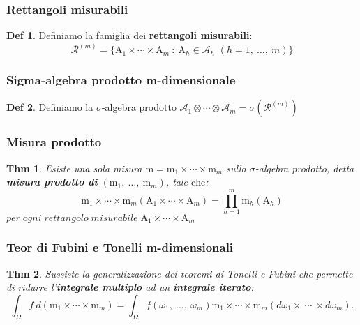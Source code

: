 \documentclass[a4paper,11pt]{article}
\theoremstyle{plain}
\newtheorem{thm}{Thm}[section]
\theoremstyle{definition}
\newtheorem{defn}{Def}[section]
\theoremstyle{remark}
\begin{document}
\subsubsection{Rettangoli misurabili}
\begin{defn} Definiamo la famiglia dei \textbf{rettangoli misurabili}:
$$
\mathcal{R}^{(m)}=\{\mathrm{A}_{1}\times\cdots\times \mathrm{A}_{m}\ :\ \mathrm{A}_{h}\in \mathcal{A}_{h} \, \, (h=1,\ \ldots,\ m)\}
$$
\end{defn}

\subsubsection{Sigma-algebra prodotto m-dimensionale}
\begin{defn} Definiamo la $\sigma$-algebra prodotto $\mathcal{A}_{1}\otimes\cdots\otimes \mathcal{A}_{m}=\sigma(\mathcal{R}^{(m)})$

\end{defn}

\subsubsection{Misura prodotto}
\begin{thm}
Esiste una sola misura $\mathrm{m}=\mathrm{m}_{1}\times\cdots\times \mathrm{m}_{m}$ sulla $\sigma$-algebra prodotto, detta \textbf{misura prodotto di} $( \mathrm{m}_{1},\ \ldots,\ \mathrm{m}_{m})$, tale $\mathrm{c}\mathrm{h}\mathrm{e}$:
$$
\displaystyle \mathrm{m}_{1}\times\cdots\times \mathrm{m}_{m}(\mathrm{A}_{1}\times\cdots\times \mathrm{A}_{m})=\prod_{h=1}^{m}\mathrm{m}_{h}(\mathrm{A}_{h})$$
$per \; ogni \; rettangolo \; misurabile \;  \mathrm{A}_{1}\times\cdots\times \mathrm{A}_{m}$ 

\end{thm}

\subsubsection{Teor di Fubini e Tonelli m-dimensionali}
\begin{thm} Sussiste la generalizzazione dei teoremi di Tonelli e Fubini che permette di ridurre l'\textbf{integrale multiplo} ad un \textbf{integrale iterato}:
$$
\displaystyle \int_{\Omega}f \ d(\mathrm{m}_{1}\times \cdots \displaystyle \times \mathrm{m}_{m})=\int_{\Omega}f(\omega_{1},\ \ldots,\ \omega_{m})\mathrm{m}_{1}\times \cdots \times \mathrm{m}_{m}(d\omega_{1}\times\ \cdots\ \times d\omega_{m}).
$$
\end{thm}
\end{document}
